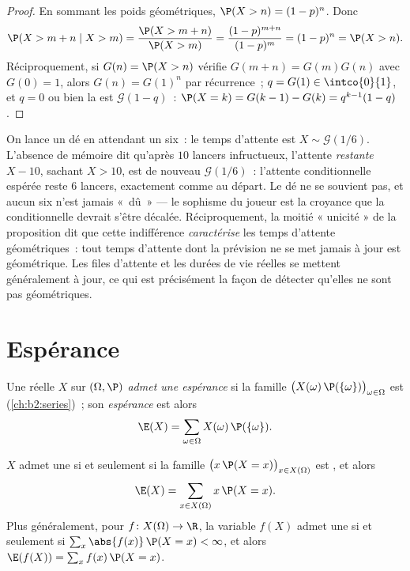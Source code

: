\begin{proof}
En sommant les poids géométriques, $\P(X > n) = (1-p)^n$. Donc
\[
\P(X > m + n \mid X > m)
= \frac{\P(X > m + n)}{\P(X > m)}
= \frac{(1-p)^{m+n}}{(1-p)^m} = (1-p)^n = \P(X > n).
\]
Réciproquement, si $G(n) = \P(X > n)$ vérifie $G(m + n) =
G(m)G(n)$ avec $G(0) = 1$, alors $G(n) = G(1)^n$ par récurrence~; $q =
G(1) \in \intco{0}{1}$, et $q = 0$ ou bien la  est
$\mathcal{G}(1 - q)$~: $\P(X = k) = G(k-1) - G(k) =
q^{k-1}(1 - q)$.
\end{proof}

\begin{example}
On lance un dé en attendant un six~: le temps d'attente est $X \sim
\mathcal G(1/6)$. L'absence de mémoire dit qu'après $10$
lancers infructueux, l'attente \emph{restante} $X - 10$, sachant
$X > 10$, est de nouveau $\mathcal G(1/6)$~: l'attente
conditionnelle espérée reste $6$ lancers, exactement comme au départ.
Le dé ne se souvient pas, et aucun six n'est jamais «~dû~» --- le
sophisme du joueur est la croyance que la  conditionnelle
devrait s'être décalée. Réciproquement, la moitié « unicité » de la
proposition dit que cette indifférence \emph{caractérise} les temps
d'attente géométriques~: tout temps d'attente dont la prévision ne se
met jamais à jour est géométrique. Les files d'attente et les durées
de vie réelles se mettent généralement à jour, ce qui est précisément
la façon de détecter qu'elles ne sont pas géométriques.
\end{example}

\section{Espérance}

\begin{definition}[Espérance]\label{def:b2:randomvar:expectation}
Une  réelle $X$ sur $(\Omega, \P)$ \emph{admet une
espérance} si la famille
$\bigl(X(\omega)\,\P(\{\omega\})\bigr)_{\omega \in \Omega}$ est
 (\cref{ch:b2:series})~; son \emph{espérance} est alors
\[
\E(X) = \sum_{\omega \in \Omega} X(\omega)\,\P(\{\omega\}) .
\]
\end{definition}

\begin{theorem}\label{thm:b2:randomvar:transfer}
$X$ admet une  si et seulement si la famille $\bigl(x\,\P(X =
x)\bigr)_{x \in X(\Omega)}$ est , et alors
\[
\E(X) = \sum_{x \in X(\Omega)} x\,\P(X = x) .
\]
Plus généralement, pour $f \colon X(\Omega) \to \R$, la variable
$f(X)$ admet une  si et seulement si $\sum_x \abs{f(x)}\,\P(X = x) <
\infty$, et alors $\E(f(X)) = \sum_x f(x)\,\P(X = x)$.
\end{theorem}

